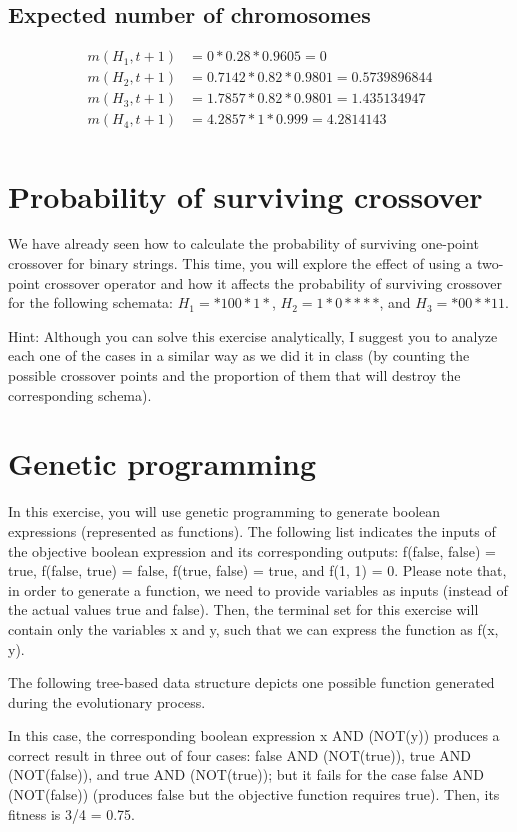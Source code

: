 \documentclass{article}
\begin{document}
\subsection*{Expected number of chromosomes}
\begin{align*}
    m(H_1,t +1) &= 0 * 0.28 * 0.9605 = 0\\
    m(H_2,t +1) &= 0.7142 * 0.82 * 0.9801 = 0.5739896844\\
    m(H_3,t +1) &= 1.7857 * 0.82 * 0.9801 = 1.435134947\\
    m(H_4,t +1) &= 4.2857 * 1 * 0.999 = 4.2814143\\
\end{align*}

\section{Probability of surviving crossover}
We have already seen how to calculate the probability of surviving one-point crossover for binary strings. This time, you will explore the effect of using a two-point crossover operator and how it affects the probability of surviving crossover for the following schemata: $H_1 = *100*1*$, $H_2 = 1*0****$, and $H_3 = *00**11$.

Hint: Although you can solve this exercise analytically, I suggest you to analyze each one of the cases in a similar way as we did it in class (by counting the possible crossover points and the proportion of them that will destroy the corresponding schema).


\section{Genetic programming}
In this exercise, you will use genetic programming to generate boolean expressions (represented as functions). The following list indicates the inputs of the objective boolean expression and its corresponding outputs: f(false, false) = true, f(false, true) = false, f(true, false) = true, and f(1, 1) = 0. Please note that, in order to generate a function, we need to provide variables as inputs (instead of the actual values true and false). Then, the terminal set for this exercise will contain only the variables x and y, such that we can express the function as f(x, y).

The following tree-based data structure depicts one possible function generated during the evolutionary process.

In this case, the corresponding boolean expression x AND (NOT(y)) produces a correct result in three out of four cases: false AND (NOT(true)), true AND (NOT(false)), and true AND (NOT(true)); but it fails for the case false AND (NOT(false)) (produces false but the objective function requires true). Then, its fitness is 3/4 = 0.75.
\end{document}
